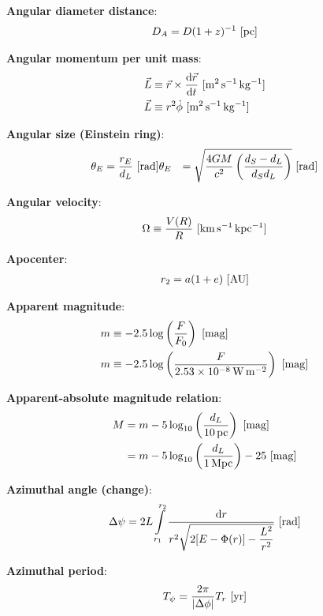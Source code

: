 \documentclass[a4paper,10pt]{article}
\begin{document}
{\noindent}\textbf{Angular diameter distance}:
\begin{align*}
    D_A = D(1+z)^{-1} ~ [{\rm pc}]
\end{align*}

{\noindent}\textbf{Angular momentum per unit mass}:
\begin{align*}
    \vec{L}&\equiv\vec{r}\times\frac{{\rm d}\vec{r}}{{\rm d}t} ~ [{\rm m^2\,s^{-1}\,kg^{-1}}] \\
    \vec{L}&\equiv r^2\dot{\phi} ~ [{\rm m^2\,s^{-1}\,kg^{-1}}]
\end{align*}

{\noindent}\textbf{Angular size (Einstein ring)}:
\begin{align*}
    \theta_E &= \frac{r_E}{d_L} ~ [{\rm rad}]
    \theta_E &= \sqrt{\frac{4GM}{c^2} \left(\frac{d_S-d_L}{d_Sd_L}\right)} ~ [{\rm rad}]
\end{align*}

{\noindent}\textbf{Angular velocity}:
\begin{align*}
    \Omega \equiv \frac{V(R)}{R} ~ [{\rm km\,s^{-1}\,kpc^{-1}}]
\end{align*}

{\noindent}\textbf{Apocenter}:
\begin{align*}
    r_2 = a(1+e) ~ [{\rm AU}]
\end{align*}

{\noindent}\textbf{Apparent magnitude}:
\begin{align*}
     m &\equiv -2.5\log\left(\frac{F}{F_0}\right) ~ [{\rm mag}] \\
     m &\equiv -2.5\log\left(\frac{F}{2.53\times10^{-8}\,{\rm W\,m^{-2}}}\right) ~ [{\rm mag}]
\end{align*}

{\noindent}\textbf{Apparent-absolute magnitude relation}:
\begin{align*}
    M &= m -5\log_{10}\left(\frac{d_L}{10\,{\rm pc}}\right) ~ [{\rm mag}] \\
      &= m -5\log_{10}\left(\frac{d_L}{1\,{\rm Mpc}}\right)-25 ~ [{\rm mag}]
\end{align*}

{\noindent}\textbf{Azimuthal angle (change)}:
\begin{align*}
    \Delta\psi = 2L\int\limits_{r_1}^{r_2} \frac{{\rm d}r}{r^2\sqrt{2[E-\Phi(r)]-\dfrac{L^2}{r^2}}} ~ [{\rm rad}]
\end{align*}

{\noindent}\textbf{Azimuthal period}:
\begin{align*}
    T_\psi = \frac{2\pi}{\lvert\Delta\phi\rvert}T_r ~ [{\rm yr}]
\end{align*}
\end{document}
